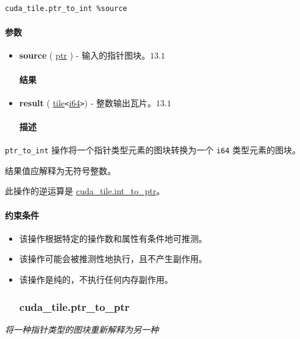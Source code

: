 \documentclass{article}
\begin{document}
\begin{lstlisting}
cuda_tile.ptr_to_int %source
\end{lstlisting}

\paragraph{参数}

\begin{itemize}
\item \textbf{source} ( \href{https://docs.nvidia.com/cuda/tile-ir/latest/sections/types.html#type-ptr}{ptr} ) - 输入的指针图块。$\boxed{13.1}$


\paragraph{结果}

\item \textbf{result} ( \href{https://docs.nvidia.com/cuda/tile-ir/latest/sections/types.html#type-tile}{tile}\texttt{<}\href{https://docs.nvidia.com/cuda/tile-ir/latest/sections/types.html#subsection-element-types}{i64}\texttt{>}) - 整数输出瓦片。$\boxed{13.1}$


\paragraph{描述}

\end{itemize}
\texttt{ptr\_to\_int} 操作将一个指针类型元素的图块转换为一个 \texttt{i64} 类型元素的图块。


结果值应解释为无符号整数。


此操作的逆运算是 \href{https://docs.nvidia.com/cuda/tile-ir/latest/sections/operations.html#op-cuda-tile-int-to-ptr}{cuda\_tile.int\_to\_ptr}。



\paragraph{约束条件}

\begin{itemize}
\item 该操作根据特定的操作数和属性有条件地可推测。
\item 该操作可能会被推测性地执行，且不产生副作用。
\item 该操作是纯的，不执行任何内存副作用。


\subsubsection{cuda\_tile.ptr\_to\_ptr}

\end{itemize}
\textit{将一种指针类型的图块重新解释为另一种}
\end{document}
